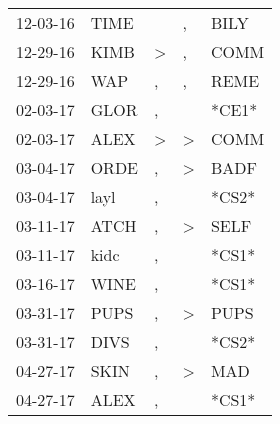 \begin{supertabular}{p{0.07\textwidth}p{0.06\textwidth}p{0.02\textwidth}p{0.02\textwidth}p{0.06\textwidth}}
          12-03-16\textsuperscript{} &           TIME\textsuperscript{} &                  &                , &           BILY\textsuperscript{} \\
          12-29-16\textsuperscript{} &           KIMB\textsuperscript{} &     \textgreater &                , &           COMM\textsuperscript{} \\
          12-29-16\textsuperscript{} &            WAP\textsuperscript{} &                , &                , &           REME\textsuperscript{} \\
          02-03-17\textsuperscript{} &           GLOR\textsuperscript{} &                , &                  &                            *CE1* \\
          02-03-17\textsuperscript{} &           ALEX\textsuperscript{} &     \textgreater &     \textgreater &           COMM\textsuperscript{} \\
          03-04-17\textsuperscript{} &           ORDE\textsuperscript{} &                , &     \textgreater &           BADF\textsuperscript{} \\
          03-04-17\textsuperscript{} &           layl\textsuperscript{} &                , &                  &                            *CS2* \\
          03-11-17\textsuperscript{} &           ATCH\textsuperscript{} &                , &     \textgreater &           SELF\textsuperscript{} \\
          03-11-17\textsuperscript{} &           kidc\textsuperscript{} &                , &                  &                            *CS1* \\
          03-16-17\textsuperscript{} &           WINE\textsuperscript{} &                , &                  &                            *CS1* \\
          03-31-17\textsuperscript{} &           PUPS\textsuperscript{} &                , &     \textgreater &           PUPS\textsuperscript{} \\
          03-31-17\textsuperscript{} &           DIVS\textsuperscript{} &                , &                  &                            *CS2* \\
          04-27-17\textsuperscript{} &           SKIN\textsuperscript{} &                , &     \textgreater &            MAD\textsuperscript{} \\
          04-27-17\textsuperscript{} &           ALEX\textsuperscript{} &                , &                  &                            *CS1* \\

\end{supertabular}
